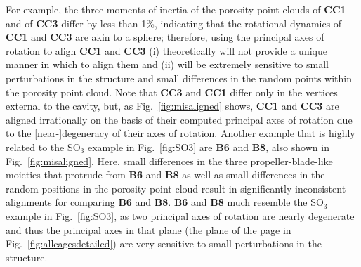 \documentclass[journal=jacsat,manuscript=article]{achemso}
\begin{document}
{For example, the three moments of inertia of the porosity point clouds of \textbf{CC1} and of \textbf{CC3} differ by less than 1\%, indicating that the rotational dynamics of \textbf{CC1} and \textbf{CC3} are akin to a sphere; therefore, using the principal axes of rotation to align \textbf{CC1} and \textbf{CC3} (i) theoretically will not provide a unique manner in which to align them and (ii) will be extremely sensitive to small perturbations in the structure and small differences in the random points within the porosity point cloud. Note that \textbf{CC3} and \textbf{CC1} differ only in the vertices external to the cavity, but, as Fig.~\ref{fig:misaligned} shows, \textbf{CC1} and \textbf{CC3} are aligned irrationally on the basis of their computed principal axes of rotation due to the [near-]degeneracy of their axes of rotation. Another example that is highly related to the SO$_3$ example in Fig.~\ref{fig:SO3} are \textbf{B6} and \textbf{B8}, also shown in Fig.~\ref{fig:misaligned}. Here, small differences in the three propeller-blade-like moieties that protrude from \textbf{B6} and \textbf{B8} as well as small differences in the random positions in the porosity point cloud result in significantly inconsistent alignments for comparing \textbf{B6} and \textbf{B8}. \textbf{B6} and \textbf{B8} much resemble the SO$_3$ example in Fig.~\ref{fig:SO3}, as two principal axes of rotation are nearly degenerate and thus the principal axes in that plane (the plane of the page in Fig.~\ref{fig:allcagesdetailed}) are very sensitive to small perturbations in the structure.

}
\end{document}

